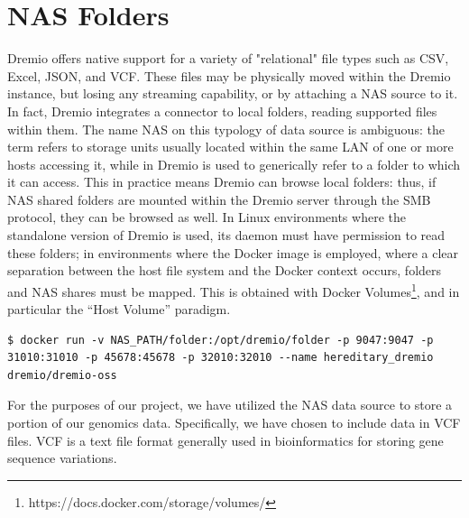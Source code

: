 \section{NAS Folders}
Dremio offers native support for a variety of "relational" file types such as \ac{CSV}, Excel, \ac{JSON}, and \ac{VCF}. These files may be physically moved within the Dremio instance, but losing any streaming capability, or by attaching a \ac{NAS} source to it. In fact, Dremio integrates a connector to local folders, reading supported files within them. The name \ac{NAS} on this typology of data source is ambiguous: the term refers to storage units usually located within the same \ac{LAN} of one or more hosts accessing it, while in Dremio is used to generically refer to a folder to which it can access.
This in practice means Dremio can browse local folders: thus, if NAS shared folders are mounted within the Dremio server through the \ac{SMB} protocol, they can be browsed as well.
In Linux environments where the standalone version of Dremio is used, its daemon must have permission to read these folders; in environments where the Docker image is employed, where a clear separation between the host file system and the Docker context occurs, folders and \ac{NAS} shares must be mapped. This is obtained with Docker Volumes\footnote{ https://docs.docker.com/storage/volumes/}, and in particular the “Host Volume” paradigm.
\begin{lstlisting}
$ docker run -v NAS_PATH/folder:/opt/dremio/folder -p 9047:9047 -p 31010:31010 -p 45678:45678 -p 32010:32010 --name hereditary_dremio dremio/dremio-oss
\end{lstlisting}
For the purposes of our project, we have utilized the \ac{NAS} data source to store a portion of our genomics data. Specifically, we have chosen to include data in \ac{VCF} files. \ac{VCF} is a text file format generally used in bioinformatics for storing gene sequence variations.
